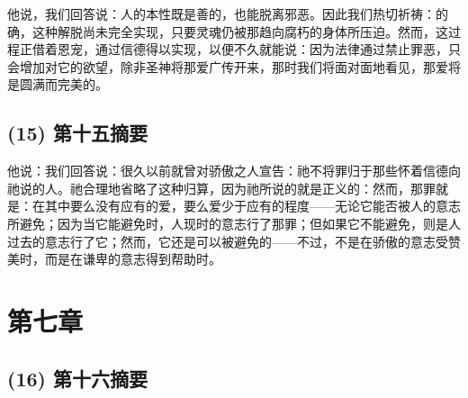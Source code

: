 他说，我们回答说：人的本性既是善的，也能脱离邪恶。因此我们热切祈祷：的确，这种解脱尚未完全实现，只要灵魂仍被那趋向腐朽的身体所压迫。然而，这过程正借着恩宠，通过信德得以实现，以便不久就能说：因为法律通过禁止罪恶，只会增加对它的欲望，除非圣神将那爱广传开来，那时我们将面对面地看见，那爱将是圆满而完美的。\par


\subsection{(15) 第十五摘要}

他说：我们回答说：很久以前就曾对骄傲之人宣告：祂不将罪归于那些怀着信德向祂说的人。祂合理地省略了这种归算，因为祂所说的就是正义的：然而，那罪就是：在其中要么没有应有的爱，要么爱少于应有的程度——无论它能否被人的意志所避免；因为当它能避免时，人现时的意志行了那罪；但如果它不能避免，则是人过去的意志行了它；然而，它还是可以被避免的——不过，不是在骄傲的意志受赞美时，而是在谦卑的意志得到帮助时。\par


\section{第七章}


\subsection{(16) 第十六摘要}

